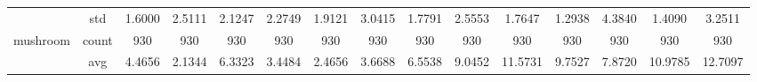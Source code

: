 \begin{table}[H]
{\begin{tabular}{rcccc|c|c|c|c|c|ccccc}
			                                                                               & std                                    & 1.6000                                                                             & 2.5111                                                                    & 2.1247                                                                    & 2.2749                                         & 1.9121                                                                    & 3.0415                                       & 1.7791                                      & 2.5553                                         & 1.7647                                         & 1.2938                                          & 4.3840                                          & 1.4090                                         & 3.2511                                         \\
			mushroom                                                                       & count                                  & 930                                                                                & 930                                                                       & 930                                                                       & 930                                            & 930                                                                       & 930                                          & 930                                         & 930                                            & 930                                            & 930                                             & 930                                             & 930                                            & 930                                            \\
			                                                                               & avg                                    & 4.4656                                                                             & \cellcolor[rgb]{ .776,  .937,  .808}\textcolor[rgb]{ 0,  .38,  0}{2.1344} & 6.3323                                                                    & 3.4484                                         & 2.4656                                                                    & 3.6688                                       & 6.5538                                      & 9.0452                                         & 11.5731                                        & 9.7527                                          & 7.8720                                          & 10.9785                                        & 12.7097                                        \\

\end{tabular}}
\end{table}

